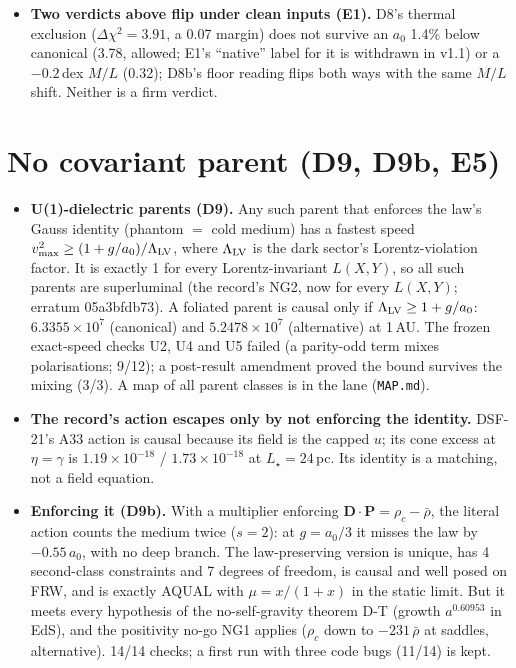 \documentclass[10pt]{article}
\begin{document}
\begin{itemize}
\item \textbf{Two verdicts above flip under clean inputs (E1).} D8's thermal exclusion ($\Delta\chi^2=3.91$, a 0.07 margin) does not survive an $a_0$ 1.4\% below canonical (3.78, allowed; E1's ``native'' label for it is withdrawn in v1.1) or a $-0.2$\,dex $M/L$ (0.32); D8b's floor reading flips both ways with the same $M/L$ shift. Neither is a firm verdict.
\end{itemize}

\section{No covariant parent (D9, D9b, E5)}
\begin{itemize}
\item \textbf{U(1)-dielectric parents (D9).} Any such parent that enforces the law's Gauss identity (phantom $=$ cold medium) has a fastest speed $v_{\max}^2\ge(1+g/a_0)/\Lambda_{\rm LV}$, where $\Lambda_{\rm LV}$ is the dark sector's Lorentz-violation factor. It is exactly 1 for every Lorentz-invariant $L(X,Y)$, so all such parents are superluminal (the record's NG2, now for every $L(X,Y)$; erratum 05a3bfdb73). A foliated parent is causal only if $\Lambda_{\rm LV}\ge1+g/a_0$: $6.3355\times10^{7}$ (canonical) and $5.2478\times10^{7}$ (alternative) at 1\,AU. The frozen exact-speed checks U2, U4 and U5 failed (a parity-odd term mixes polarisations; 9/12); a post-result amendment proved the bound survives the mixing (3/3). A map of all parent classes is in the lane (\texttt{MAP.md}).
\item \textbf{The record's action escapes only by not enforcing the identity.} DSF-21's A33 action is causal because its field is the capped $u$; its cone excess at $\eta=\gamma$ is $1.19\times10^{-18}$ / $1.73\times10^{-18}$ at $L_\star=24$\,pc. Its identity is a matching, not a field equation.
\item \textbf{Enforcing it (D9b).} With a multiplier enforcing $\mathbf D\cdot\mathbf P=\rho_c-\bar\rho$, the literal action counts the medium twice ($s=2$): at $g=a_0/3$ it misses the law by $-0.55\,a_0$, with no deep branch. The law-preserving version is unique, has 4 second-class constraints and 7 degrees of freedom, is causal and well posed on FRW, and is exactly AQUAL with $\mu=x/(1+x)$ in the static limit. But it meets every hypothesis of the no-self-gravity theorem D-T (growth $a^{0.60953}$ in EdS), and the positivity no-go NG1 applies ($\rho_c$ down to $-231\,\bar\rho$ at saddles, alternative). 14/14 checks; a first run with three code bugs (11/14) is kept.

\end{itemize}
\end{document}
